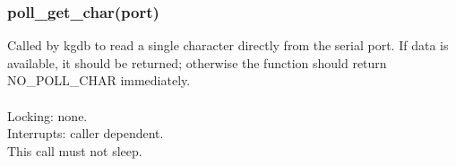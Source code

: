 \documentclass[12pt,a4paper]{article}
\begin{document}
\subsubsection{poll\_get\_char(port)}
	Called by kgdb to read a single character directly from the serial
	port.  If data is available, it should be returned; otherwise
	the function should return NO\_POLL\_CHAR immediately.\\ \\
	Locking: none.\\
	Interrupts: caller dependent.\\
	This call must not sleep.	\\ \\
\end{document}
